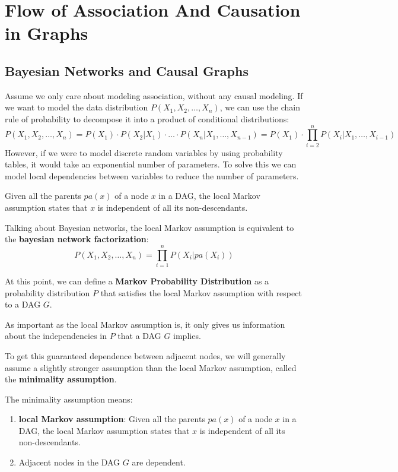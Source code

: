 \chapter{Flow of Association And Causation in Graphs}
\section{Bayesian Networks and Causal Graphs}
Assume we only care about modeling association, without any causal modeling. If
we want to model the data distribution $P(X_1, X_2, \ldots, X_n)$, we can use
the chain rule of probability to decompose it into a product of conditional
distributions:
\begin{equation}
    P(X_1, X_2, \ldots, X_n) = P(X_1) \cdot P(X_2|X_1) \cdot \ldots \cdot P(X_n|X_1,
    \ldots, X_{n-1}) = P(X_1) \cdot \prod_{i=2}^n P(X_i|X_1, \ldots, X_{i-1})
\end{equation}
However, if we were to model discrete random variables by using probability
tables, it would take an exponential number of parameters. To solve this we
can model local dependencies between variables to reduce the number of
parameters.

\begin{definition}
    Given all the parents $pa(x)$ of a node $x$ in a DAG, the local Markov
    assumption states that $x$ is independent of all its non-descendants.
\end{definition}
Talking about Bayesian networks, the local Markov assumption is equivalent to
the \textbf{bayesian network factorization}:
\begin{equation}
    P(X_1, X_2, \ldots, X_n) = \prod_{i=1}^n P(X_i|pa(X_i))
\end{equation}

At this point, we can define a \textbf{Markov Probability Distribution} as a
probability distribution $P$ that satisfies the local Markov assumption with
respect to a DAG $G$.

As important as the local Markov assumption is, it only gives us information
about the independencies in $P$ that a DAG $G$ implies.

To get this guaranteed dependence between adjacent nodes, we will generally
assume a slightly stronger assumption than the local Markov assumption, called
the \textbf{minimality assumption}.
\begin{definition}
    The minimality assumption means:
    \begin{enumerate}
        \item \textbf{local Markov assumption}: Given all the parents $pa(x)$ of
              a node $x$ in a DAG, the local Markov assumption states that $x$
              is independent of all its non-descendants.
        \item Adjacent nodes in the DAG $G$ are dependent.
    \end{enumerate}
\end{definition}

